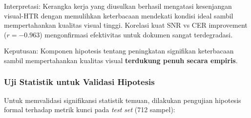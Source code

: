 \documentclass[12pt,a4paper]{article}
\begin{document}
Interpretasi: Kerangka kerja yang diusulkan berhasil mengatasi kesenjangan visual-HTR dengan memulihkan keterbacaan mendekati kondisi ideal sambil mempertahankan kualitas visual tinggi. Korelasi kuat SNR vs CER improvement ($r = -0.963$) mengonfirmasi efektivitas untuk dokumen sangat terdegradasi.

Keputusan: Komponen hipotesis tentang peningkatan signifikan keterbacaan sambil mempertahankan kualitas visual \textbf{terdukung penuh secara empiris}.

\vspace{0.8em}

\subsubsection{Uji Statistik untuk Validasi Hipotesis}
\label{subsubsec:uji-statistik}

Untuk memvalidasi signifikansi statistik temuan, dilakukan pengujian hipotesis formal terhadap metrik kunci pada \textit{test set} (712 sampel):
\end{document}
